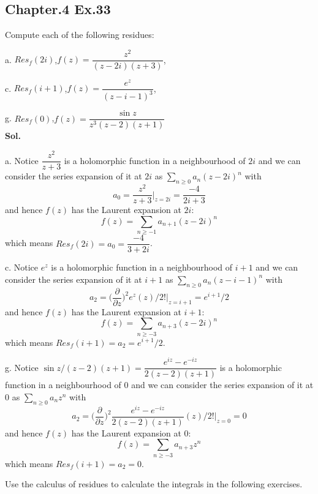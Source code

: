 \documentclass[lang=en,11pt,a4paper,citestyle =authoryear]{elegantpaper}
\newcommand{\ParZ}{\dfrac{\partial}{\partial z}}
\begin{document}
\subsection*{Chapter.4 Ex.33} 
Compute each of the following residues:\par
a. $Res_f(2i)$,\quad$f(z) = \dfrac{z^2}{(z-2i)(z+3)}$,\par
c. $Res_f(i+1)$,\quad$f(z) = \dfrac{e^z}{(z-i-1)^3}$,\par
g. $Res_f(0)$,\quad$f(z) = \dfrac{\sin z}{z^3(z-2)(z+1)}$
\vspace{0.5em}\\
\textbf{Sol.} \par
a. Notice $\dfrac{z^2}{z+3}$ is a holomorphic function in a neighbourhood of $2i$ and we can consider the series expansion of  it at $2i$ as $\sum_{n\geq 0} a_n(z-2i)^n$ with 
\[a_0 = \dfrac{z^2}{z+3}|_{z=2i} = \dfrac{-4}{2i+3}\]
and hence $f(z)$ has the Laurent expansion at $2i$:
\[
f(z) = \sum_{n\geq -1} a_{n+1}(z-2i)^n
\]
which means $Res_f(2i) = a_0 = \dfrac{-4}{3+2i}$.\par
c. Notice $e^z$ is a holomorphic function in a neighbourhood of $i+1$ and we can consider the series expansion of  it at $i+1$ as $\sum_{n\geq 0} a_n(z-i-1)^n$ with 
\[a_2 = \Big(\ParZ\Big)^2e^z(z)/2!|_{z=i+1} = e^{i+1}/2\]
and hence $f(z)$ has the Laurent expansion at $i+1$:
\[
f(z) = \sum_{n\geq -3} a_{n+3}(z-2i)^n
\]
which means $Res_f(i+1) = a_2 = e^{i+1}/2$.\par
g. Notice $\sin z/(z-2)(z+1) = \dfrac{e^{iz}-e^{-iz}}{2(z-2)(z+1)}$ is a holomorphic function in a neighbourhood of $0$ and we can consider the series expansion of  it at $0$ as $\sum_{n\geq 0} a_nz^n$ with 
\[a_2 = \Big(\ParZ\Big)^2\dfrac{e^{iz}-e^{-iz}}{2(z-2)(z+1)}(z)/2!|_{z=0} = 0\]
and hence $f(z)$ has the Laurent expansion at $0$:
\[
f(z) = \sum_{n\geq -3} a_{n+3}z^n
\]
which means $Res_f(i+1) = a_2 = 0$.\par
\vspace{0.5em}

\newpage

Use the calculus of residues to calculate the integrals in the following exercises.\par
\end{document}
